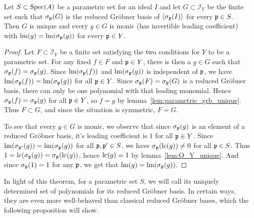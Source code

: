 \begin{theorem}\label{thm:red_grb_uniq_and_monic_and_stable}
  Let $S \subset \operatorname{Spec}(A)$ be a parametric set for an ideal $I$ and let $G \subset \mathcal I_{Y}$ be the finite set such that $\sigma_{\mathfrak p}(G)$ is the reduced Gröbner basis of $\langle \sigma_{\mathfrak p}(I) \rangle$ for every $\mathfrak p \in S$. Then $G$ is unique and every $g \in G$ is monic (has invertible leading coefficient) with $\operatorname{lm}(g) = \operatorname{lm}(\sigma_{\mathfrak p}(g))$ for every $\mathfrak p \in Y$.
\end{theorem}
\begin{proof}
  Let $F \subset \mathcal I_{Y}$ be a finite set satisfying the two conditions for $Y$ to be a parametric set. For any fixed $f \in F$ and $\mathfrak p \in Y$, there is then a $g \in G$ such that $\sigma_{\mathfrak p}(f) = \sigma_{\mathfrak p}(g)$. Since $\operatorname{lm}(\sigma_{\mathfrak p}(f))$ and $\operatorname{lm}(\sigma_{\mathfrak p}(g))$ is independent of $\mathfrak p$, we have $\operatorname{lm}(\sigma_{\mathfrak p}(f)) = \operatorname{lm}(\sigma_{\mathfrak p}(g))$ for all $\mathfrak p \in Y$. Since $\sigma_{\mathfrak p}(F) = \sigma_{\mathfrak p}(G)$ is a reduced Gröbner basis, there can only be one polynomial with that leading monomial. Hence $\sigma_{\mathfrak p}(f) = \sigma_{\mathfrak p}(g)$ for all $\mathfrak p \in Y$, so $f = g$ by lemma~\ref{lem:parametric_grb_unique}. Thus $F \subset G$, and since the situation is symmetric, $F = G$.

  To see that every $g \in G$ is monic, we observe that since $\sigma_{\mathfrak p}(g)$ is an element of a reduced Gröbner basis, it's leading coefficient is $1$ for all $\mathfrak p \in Y$. Since $\operatorname{lm}(\sigma_{\mathfrak p'}(g)) = \operatorname{lm}(\sigma_{\mathfrak p}(g))$ for all $\mathfrak p, \mathfrak p' \in S$, we have $\sigma_{\mathfrak p}(\operatorname{lc}(g)) \neq 0$ for all $\mathfrak p \in S$. Thus $1 = \operatorname{lc}(\sigma_{\mathfrak p}(g)) = \sigma_{\mathfrak p}(\operatorname{lc}(g))$, hence $\operatorname{lc}(g) = 1$ by lemma~\ref{lem:O_Y_unique}. And since $\sigma_{\mathfrak p}(1) = 1$ for any $\mathfrak p$, we get that $\operatorname{lm}(g) = \operatorname{lm}(\sigma_{\mathfrak p}(g))$.
\end{proof}

In light of this theorem, for a parametric set $S$, we will call its uniquely determined set of polynomials for its reduced Gröbner basis. In certain ways, they are even more well-behaved than classical reduced Gröbner bases, which the following proposition will show.

